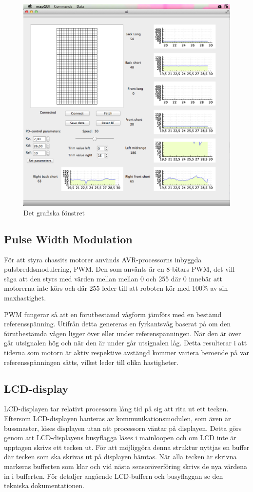 \documentclass[a4paper,12pt,fleqn]{article}
\begin{document}
\begin{figure}[htp] %
  \begin{center}
  \includegraphics[keepaspectratio=true,width=0.5\linewidth]{gui.png}  %
  \end{center}
  \caption{Det grafiska fönstret} %
  \label{fig:gui}
\end{figure}

\subsection{Pulse Width Modulation}

För att styra chassits motorer används AVR-processorns inbyggda pulsbreddsmodulering, PWM. Den som använts är en 8-bitars PWM, det vill säga att den styrs med värden mellan mellan 0 och 255 där 0 innebär att motorerna inte körs och där 255 leder till att roboten kör med 100\% av sin maxhastighet.

PWM fungerar så att en förutbestämd vågform jämförs med en bestämd referensspänning. Utifrån detta genereras en fyrkantsvåg baserat på om den förutbestämda vågen ligger över eller under referenspänningen. När den är över går utsignalen hög och när den är under går utsignalen låg. Detta resulterar i att tiderna som motorn är aktiv respektive avstängd kommer variera beroende på var referensspänningen sätts, vilket leder till olika hastigheter.


\subsection{LCD-display}
LCD-displayen tar relativt processorn lång tid på sig att rita ut ett tecken. Eftersom LCD-displayen hanteras av kommunikationsmodulen, som även är bussmaster, löses displayen utan att processorn väntar på displayen. Detta görs genom att LCD-displayens busyflagga läses i mainloopen och om LCD inte är upptagen skrivs ett tecken ut. För att möjliggöra denna struktur nyttjas en buffer där tecken som ska skrivas ut på displayen hämtas. När alla tecken är skrivna markeras bufferten som klar och vid nästa sensoröverföring skrivs de nya värdena in i bufferten. För detaljer angående LCD-buffern och busyflaggan se den tekniska dokumentationen.
\end{document}
